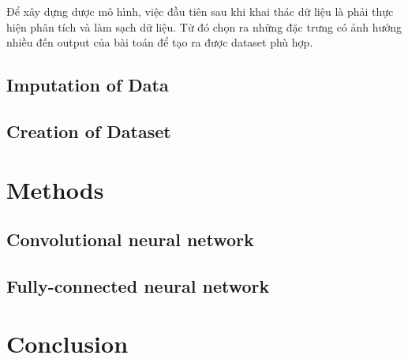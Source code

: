 \documentclass{article}
\begin{document}
\qquad Để xây dựng dược mô hình, việc đầu tiên sau khi khai thác dữ liệu là phải thực hiện phân tích và làm sạch dữ liệu. Từ đó chọn ra những đặc trưng có ảnh hưởng nhiều đến output của bài toán để tạo ra được dataset phù hợp.

\subsection{Imputation of Data}
\subsection{Creation of Dataset}



\section{Methods}

\subsection{Convolutional neural network}
\subsection{Fully-connected neural network}



\section{Conclusion}






\end{document}
